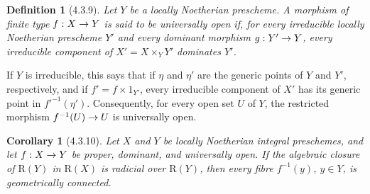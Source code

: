 \documentclass[oneside]{amsart}
\theoremstyle{ega-env-style}
\theoremstyle{ega-thm-env-style}
\newtheorem*{corollary}{Corollary}
\theoremstyle{ega-defn-env-style}
\newtheorem*{definition}{Definition}
\renewcommand{\to}{\mathchoice{\longrightarrow}{\rightarrow}{\rightarrow}{\rightarrow}}
\let\EGAOriginalLabel\label
\renewcommand{\label}[1]{\phantomsection\EGAOriginalLabel{#1}}
\begin{document}
\begin{definition}[4.3.9]
\label{III.4.3.9}
Let $Y$ be a locally Noetherian prescheme.  A morphism of finite type
$f:X\to Y$ is said to be \emph{universally open} if, for every
irreducible locally Noetherian prescheme $Y'$ and every dominant
morphism $g:Y'\to Y$, every irreducible component of
$X'=X\times_Y Y'$ dominates $Y'$.
\end{definition}

If $Y$ is irreducible, this says that if $\eta$ and $\eta'$ are the
generic points of $Y$ and $Y'$, respectively, and if
$f'=f\times 1_{Y'}$, every irreducible component of $X'$ has its
generic point in $f'^{-1}(\eta')$.  Consequently, for every open set
$U$ of $Y$, the restricted morphism $f^{-1}(U)\to U$ is universally
open.

\begin{corollary}[4.3.10]
\label{III.4.3.10}
Let $X$ and $Y$ be locally Noetherian integral preschemes, and let
$f:X\to Y$ be proper, dominant, and universally open.  If the
algebraic closure of $\mathrm{R}(Y)$ in $\mathrm{R}(X)$ is radicial over
$\mathrm{R}(Y)$, then every fibre $f^{-1}(y)$, $y\in Y$, is geometrically
connected.
\end{corollary}
\end{document}
